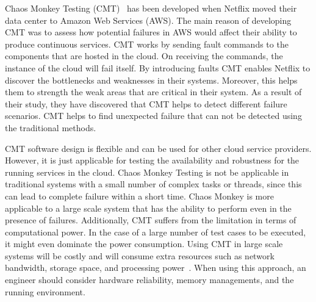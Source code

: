 Chaos Monkey Testing (CMT)~\cite{FaaS} has been developed when Netflix moved their data center to Amazon Web Services (AWS). The main reason of developing CMT was to assess how potential failures in AWS would affect their ability to produce continuous services. 
CMT works by sending fault commands to the components that are hosted in the cloud. On receiving the commands, the instance of the cloud will fail itself. By introducing faults CMT enables Netflix to discover the bottlenecks and weaknesses in their systems. Moreover, this helps them to strength the weak areas that are critical in their system. As a result of their study, they have discovered that CMT helps to detect different failure scenarios. CMT helps to find unexpected failure that can not be detected using the traditional methods. %

CMT software design is flexible and can be used for other cloud service providers. However, it is just applicable for testing the availability and robustness for the running services in the cloud. Chaos Monkey Testing is not be applicable in traditional systems with a small number of complex tasks or threads, since this can lead to complete failure within a short time. Chaos Monkey is more applicable to a large scale system that has the ability to perform even in the presence of failures. %
Additionally, CMT suffers from the limitation in terms of computational power. In the case of a large number of test cases to be executed, it might even dominate the power consumption. Using CMT in large scale systems will be costly and will consume extra resources such as network bandwidth, storage space, and processing power~\cite{gunawi2011failure}. When using this approach, an engineer should consider hardware reliability, memory managements, and the running environment. 
 
